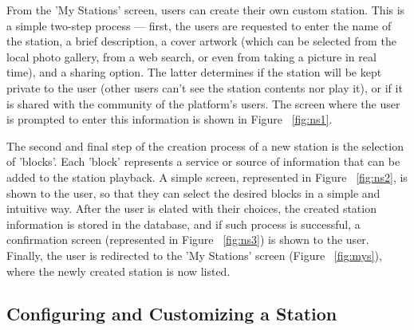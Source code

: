 From the 'My Stations' screen, users can create their own custom station. This is a simple two-step process  — first, the users are requested to enter the name of the station, a brief description, a cover artwork (which can be selected from the local photo gallery, from a web search, or even from taking a picture in real time), and a sharing option. The latter determines if the station will be kept private to the user (other users can't see the station contents nor play it), or if it is shared with the community of the platform's users. The screen where the user is prompted to enter this information is shown in Figure ~\ref{fig:ns1}.

The second and final step of the creation process of a new station is the selection of 'blocks'. Each 'block' represents a service or source of information that can be added to the station playback. A simple screen, represented in Figure ~\ref{fig:ns2}, is shown to the user, so that they can select the desired blocks in a simple and intuitive way. After the user is elated with their choices, the created station information is stored in the database, and if such process is successful, a confirmation screen  (represented in Figure ~\ref{fig:ns3}) is shown to the user. Finally, the user is redirected to the 'My Stations' screen (Figure ~\ref{fig:mys}), where the newly created station is now listed.


\subsection{Configuring and Customizing a Station}



